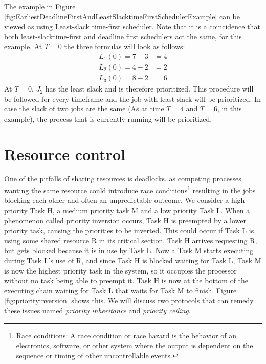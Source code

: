 \noindent The example in Figure \ref{fig:EarliestDeadlineFirstAndLeastSlacktimeFirstSchedulerExample} can be viewed as using Least-slack time-first scheduler. Note that it is a coincidence that both least-slacktime-first and deadline first schedulers act the same, for this example. At $T=0$ the three formulas will look as follows:
\begin{align}
	L_1(0)=7-3&=4 \\
	L_2(0)=4-2&=2 \\
	L_3(0)=8-2&=6
\end{align}
At $T=0$, $J_2$ has the least slack and is therefore prioritized. This procedure will be followed for every timeframe and the job with least slack will be prioritized. In case the slack of two jobs are the same (As at time $T=4$ and $T=6$, in this example), the process that is currently running will be prioritized.

\section{Resource control}

One of the pitfalls of sharing resources is deadlocks, as competing processes wanting the same resource could introduce race conditions\footnote{Race conditions: A race condition or race hazard is the behavior of an electronics, software, or other system where the output is dependent on the sequence or timing of other uncontrollable events.} resulting in the jobs blocking each other and often an unpredictable outcome. We consider a high priority Task H, a medium priority task M and a low priority Task L. When a phenomenon called priority inversion occurs, Task H is preempted by a lower priority task, causing the priorities to be inverted. This could occur if Task L is using some shared resource R in its critical section, Task H arrives requesting R, but gets blocked because it is in use by Task L. Now a Task M starts executing during Task L's use of R, and since Task H is blocked waiting for Task L, Task M is now the highest priority task in the system, so it occupies the processor without no task being able to preempt it. Task H is now at the bottom of the executing chain waiting for Task L that waits for Task M to finish. Figure \ref{fig:priorityinversion} shows this.  We will discuss two protocols that can remedy these issues named \textit{priority inheritance} and \textit{priority ceiling}.

